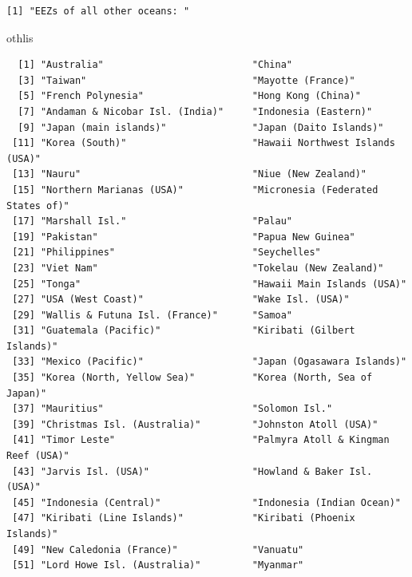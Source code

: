 \documentclass[
  letterpaper,
  oneside,
  open=any]{scrbook}
\newenvironment{Shaded}{\begin{snugshade}}{\end{snugshade}}
\newcommand{\NormalTok}[1]{\textcolor[rgb]{0.00,0.23,0.31}{#1}}
\begin{document}
\begin{verbatim}
[1] "EEZs of all other oceans: "
\end{verbatim}

\begin{Shaded}
\begin{Highlighting}[]
\NormalTok{othlis}
\end{Highlighting}
\end{Shaded}

\begin{verbatim}
  [1] "Australia"                          "China"                             
  [3] "Taiwan"                             "Mayotte (France)"                  
  [5] "French Polynesia"                   "Hong Kong (China)"                 
  [7] "Andaman & Nicobar Isl. (India)"     "Indonesia (Eastern)"               
  [9] "Japan (main islands)"               "Japan (Daito Islands)"             
 [11] "Korea (South)"                      "Hawaii Northwest Islands (USA)"    
 [13] "Nauru"                              "Niue (New Zealand)"                
 [15] "Northern Marianas (USA)"            "Micronesia (Federated States of)"  
 [17] "Marshall Isl."                      "Palau"                             
 [19] "Pakistan"                           "Papua New Guinea"                  
 [21] "Philippines"                        "Seychelles"                        
 [23] "Viet Nam"                           "Tokelau (New Zealand)"             
 [25] "Tonga"                              "Hawaii Main Islands (USA)"         
 [27] "USA (West Coast)"                   "Wake Isl. (USA)"                   
 [29] "Wallis & Futuna Isl. (France)"      "Samoa"                             
 [31] "Guatemala (Pacific)"                "Kiribati (Gilbert Islands)"        
 [33] "Mexico (Pacific)"                   "Japan (Ogasawara Islands)"         
 [35] "Korea (North, Yellow Sea)"          "Korea (North, Sea of Japan)"       
 [37] "Mauritius"                          "Solomon Isl."                      
 [39] "Christmas Isl. (Australia)"         "Johnston Atoll (USA)"              
 [41] "Timor Leste"                        "Palmyra Atoll & Kingman Reef (USA)"
 [43] "Jarvis Isl. (USA)"                  "Howland & Baker Isl. (USA)"        
 [45] "Indonesia (Central)"                "Indonesia (Indian Ocean)"          
 [47] "Kiribati (Line Islands)"            "Kiribati (Phoenix Islands)"        
 [49] "New Caledonia (France)"             "Vanuatu"                           
 [51] "Lord Howe Isl. (Australia)"         "Myanmar"                           

\end{verbatim}
\end{document}
